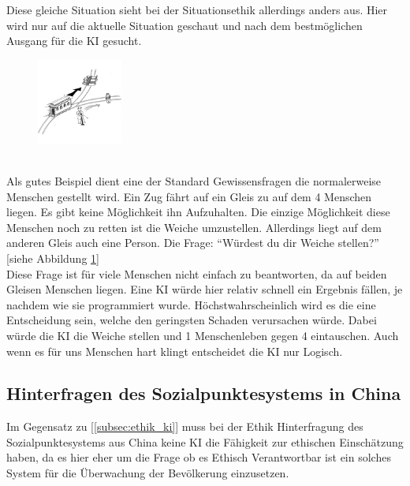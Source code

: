         Diese gleiche Situation sieht bei der Situationsethik allerdings anders aus. Hier wird nur auf die aktuelle Situation geschaut und nach dem bestmöglichen Ausgang für die KI gesucht. 

        \begin{figure}
            \centering
            \includegraphics[width=0.25\textwidth]{resources/images/img/Gewissensfrage.jpg}
            \caption{\\[Quelle \ref{image:Gewissensfrage}]}
            \label{fig:Gewissensfrage}
        \end{figure}

        Als gutes Beispiel dient eine der Standard Gewissensfragen die normalerweise Menschen gestellt wird. Ein Zug fährt auf ein Gleis zu auf dem 4 Menschen liegen. Es gibt keine Möglichkeit ihn Aufzuhalten. Die einzige Möglichkeit diese Menschen noch zu retten ist die Weiche umzustellen. Allerdings liegt auf dem anderen Gleis auch eine Person. Die Frage: \enquote{Würdest du dir Weiche stellen?} [siehe Abbildung \ref{fig:Gewissensfrage}]\\

        Diese Frage ist für viele Menschen nicht einfach zu beantworten, da auf beiden Gleisen Menschen liegen. Eine KI würde hier relativ schnell ein Ergebnis fällen, je nachdem wie sie programmiert wurde. Höchstwahrscheinlich wird es die eine Entscheidung sein, welche den geringsten Schaden verursachen würde. Dabei würde die KI die Weiche stellen und 1 Menschenleben gegen 4 eintauschen. Auch wenn es für uns Menschen hart klingt entscheidet die KI nur Logisch.

    \subsection{Hinterfragen des Sozialpunktesystems in China}
        Im Gegensatz zu [\ref{subsec:ethik_ki}] muss bei der Ethik Hinterfragung des Sozialpunktesystems aus China keine KI die Fähigkeit zur ethischen Einschätzung haben, da es hier eher um die Frage ob es Ethisch Verantwortbar ist ein solches System für die Überwachung der Bevölkerung einzusetzen.\\
        

